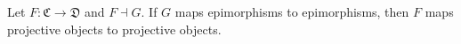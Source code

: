 Let $F : \mathfrak{C} \to \mathfrak{D}$ and $F \dashv G$. If $G$ maps epimorphisms to epimorphisms, then $F$ maps projective objects to projective objects.
